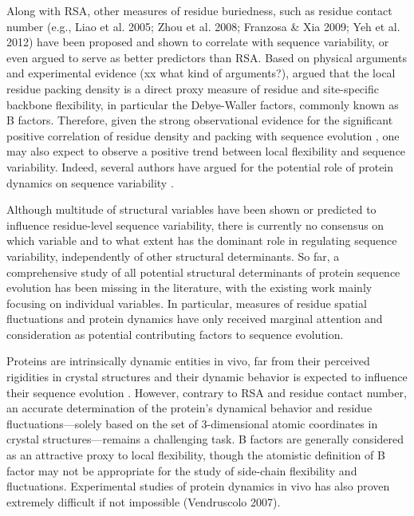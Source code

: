 \documentclass[12pt]{article}
\begin{document}
Along with RSA, other measures of residue buriedness, such as residue contact number {\color{red}(e.g., Liao et al. 2005; Zhou et al. 2008; Franzosa \& Xia 2009; Yeh et al. 2012)} have been proposed and shown to correlate with sequence variability, or even argued to serve as better predictors than RSA.  Based on physical arguments and experimental evidence (xx what kind of arguments?), \citet{Halle2002} argued that the local residue packing density is a direct proxy measure of residue and site-specific backbone flexibility, in particular the Debye-Waller factors, commonly known as B factors. Therefore, given the strong observational evidence for the significant positive correlation of residue density and packing with sequence evolution \citep{Yehetal2014}, one may also expect to observe a positive trend between local flexibility and sequence variability. Indeed, several authors have argued for the potential role of protein dynamics on sequence variability \citep{liu_sequence_2012, nevin_gerek_structural_2013}.
	
Although multitude of structural variables have been shown or predicted to influence residue-level sequence variability, there is currently no consensus on which variable and to what extent has the dominant role in regulating sequence variability, independently of other structural determinants. So far, a comprehensive study of all potential structural determinants of protein sequence evolution has been missing in the literature, with the existing work mainly focusing on individual variables. In particular, measures of residue spatial fluctuations and protein dynamics have only received marginal attention and consideration as potential contributing factors to sequence evolution.

Proteins are intrinsically dynamic entities in vivo, far from their perceived rigidities in crystal structures and their dynamic behavior is expected to influence their sequence evolution \citep{MarshTeichmann2014}.  However, contrary to RSA and residue contact number, an accurate determination of the protein's dynamical behavior and residue fluctuations---solely based on the set of 3-dimensional atomic coordinates in crystal structures---remains a challenging task. B factors are generally considered as an attractive proxy to local flexibility, though the atomistic definition of B factor may not be appropriate for the study of side-chain flexibility and fluctuations. Experimental studies of protein dynamics in vivo has also proven extremely difficult if not impossible ({\color{red}Vendruscolo 2007}).
\end{document}
